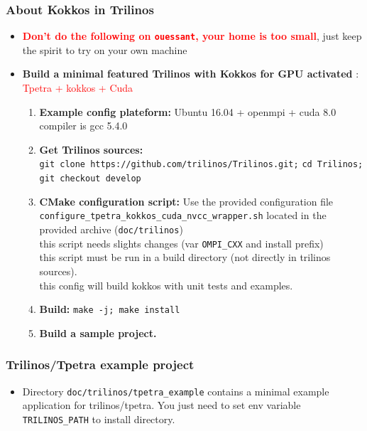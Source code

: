 \begin{frame}
  \frametitle{About Kokkos in Trilinos}

  \begin{itemize}
  \item \textcolor{red}{\textbf{Don't do the following on \texttt{ouessant}, your home is too small}}, just keep the spirit to try on your own machine
  \item \textbf{Build a minimal featured Trilinos with Kokkos for GPU activated} : \textcolor{red}{Tpetra + kokkos + Cuda}
    \begin{enumerate}
    \item \textbf{Example config plateform:} Ubuntu 16.04 + openmpi + cuda 8.0\\
      compiler is gcc 5.4.0
    \item \textbf{Get Trilinos sources:}\\
      \texttt{git clone https://github.com/trilinos/Trilinos.git;} \texttt{cd Trilinos; git checkout develop}
    \item \textbf{CMake configuration script:} Use the provided configuration file \texttt{configure\_tpetra\_kokkos\_cuda\_nvcc\_wrapper.sh} located in the provided archive (\texttt{doc/trilinos})\\
      this script needs slights changes (var \texttt{OMPI\_CXX} and install prefix)\\
      this script must be run in a build directory (not directly in trilinos sources).\\
      this config will build kokkos with unit tests and examples.
    \item \textbf{Build:} \texttt{make -j; make install}
    \item \textbf{Build a sample project.}
    \end{enumerate}
  \end{itemize}

\end{frame}

\begin{frame}
  \frametitle{Trilinos/Tpetra example project}

  \begin{itemize}
  \item Directory \texttt{doc/trilinos/tpetra\_example} contains a minimal example application for trilinos/tpetra. You just need to set env variable \texttt{TRILINOS\_PATH} to install directory.
  \end{itemize}
  
\end{frame}

